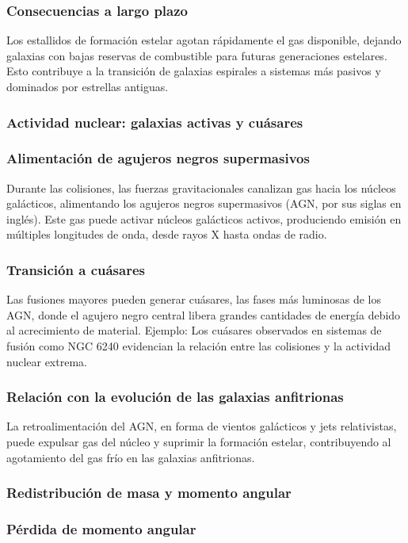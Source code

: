 \documentclass{article}
\begin{document}
\subsubsection*{Consecuencias a largo plazo}

Los estallidos de formación estelar agotan rápidamente el gas disponible, dejando galaxias con bajas reservas de combustible para futuras generaciones estelares.
Esto contribuye a la transición de galaxias espirales a sistemas más pasivos y dominados por estrellas antiguas.
\subsubsection{Actividad nuclear: galaxias activas y cuásares}
\subsubsection*{Alimentación de agujeros negros supermasivos}

Durante las colisiones, las fuerzas gravitacionales canalizan gas hacia los núcleos galácticos, alimentando los agujeros negros supermasivos (AGN, por sus siglas en inglés). Este gas puede activar núcleos galácticos activos, produciendo emisión en múltiples longitudes de onda, desde rayos X hasta ondas de radio.
\subsubsection*{Transición a cuásares}

Las fusiones mayores pueden generar cuásares, las fases más luminosas de los AGN, donde el agujero negro central libera grandes cantidades de energía debido al acrecimiento de material. Ejemplo: Los cuásares observados en sistemas de fusión como NGC 6240 evidencian la relación entre las colisiones y la actividad nuclear extrema.
\subsubsection*{Relación con la evolución de las galaxias anfitrionas}

La retroalimentación del AGN, en forma de vientos galácticos y jets relativistas, puede expulsar gas del núcleo y suprimir la formación estelar, contribuyendo al agotamiento del gas frío en las galaxias anfitrionas.
\subsubsection{Redistribución de masa y momento angular}
\subsubsection*{Pérdida de momento angular}
\end{document}
